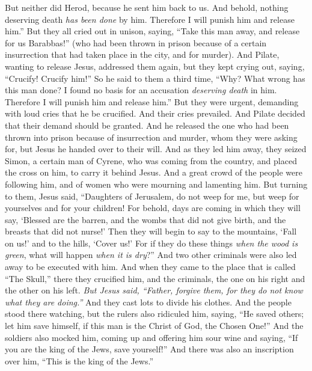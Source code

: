 \begin{biblechapter}
\verse But neither did Herod, because he sent him back to us. And behold, nothing deserving death \textit{has been done} by him.
\verse Therefore I will punish him and release him.” 
\verse But they all cried out in unison, saying, “Take this man away, and release for us Barabbas!”
\verse (who had been thrown in prison because of a certain insurrection that had taken place in the city, and for murder).
\verse And Pilate, wanting to release Jesus, addressed them﻿ again,
\verse but they kept crying out, saying, “Crucify! Crucify him!”
\verse So he said to them a third time, “Why? What wrong has this man done? I found no basis for an accusation \textit{deserving death} in him. Therefore I will punish him and release him.”
\verse But they were urgent, demanding with loud cries that he be crucified. And their cries prevailed.
\verse And Pilate decided that their demand should be granted.
\verse And he released the one who had been thrown into prison because of insurrection and murder, whom they were asking for, but Jesus he handed over to their will.
 And as they led him away, they seized Simon, a certain man of Cyrene, who was coming from the country, and placed the cross on him, to carry it behind Jesus.
\verse And a great crowd of the people were following him, and of women who were mourning and lamenting him.
\verse But turning to them, Jesus said, “Daughters of Jerusalem, do not weep for me, but weep for yourselves and for your children!
\verse For behold, days are coming in which they will say, ‘Blessed are the barren, and the wombs that did not give birth, and the breasts that did not nurse!’
\verse Then they will begin to say to the mountains, ‘Fall on us!’ and to the hills, ‘Cover us!’
\verse For if they do these things \textit{when the wood is green}, what will happen \textit{when it is dry}?”
\verse And two other criminals were also led away to be executed with him.
\verse And when they came to the place that is called “The Skull,” there they crucified him, and the criminals, the one on his right and the other on his left.
\verse \textit{But Jesus said, “Father, forgive them, for they do not know what they are doing.”} And they cast lots to divide his clothes.
\verse And the people stood there watching, but the rulers also ridiculed him, saying, “He saved others; let him save himself, if this man is the Christ of God, the Chosen One!”
\verse And the soldiers also mocked him, coming up and offering him sour wine
\verse and saying, “If you are the king of the Jews, save yourself!”
\verse And there was also an inscription over him, “This is the king of the Jews.”

\end{biblechapter}
